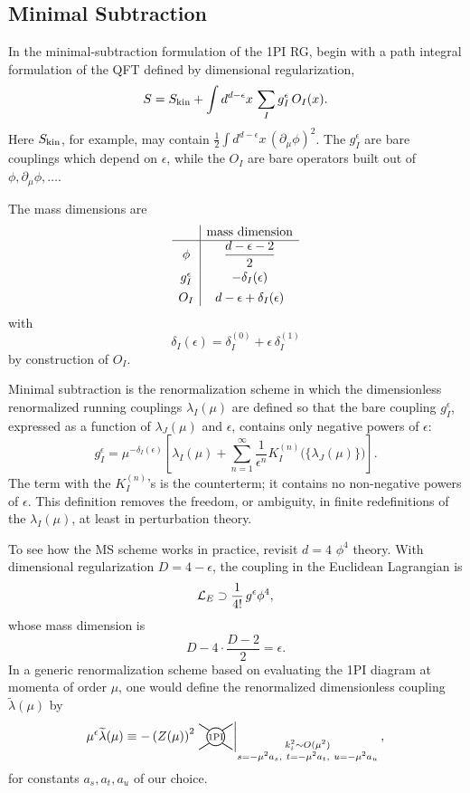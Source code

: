 \subsection{Minimal Subtraction}

In the minimal-subtraction formulation of the 1PI RG, begin with a path
integral formulation of the QFT defined by dimensional regularization,
\[
  S
  =
  S_{\rm kin}
  +
  \int d^{d-\epsilon}x\,
  \sum_I g_I^\epsilon\,O_I(x).
\]
Here \(S_{\rm kin}\), for example, may contain
\(\frac12\int d^{d-\epsilon}x\,(\partial_\mu\phi)^2\).  The \(g_I^\epsilon\)
are bare couplings which depend on \(\epsilon\), while the \(O_I\) are bare
operators built out of \(\phi,\partial_\mu\phi,\ldots\).

The mass dimensions are
\[
  \begin{array}{c|c}
    & \hbox{mass dimension}
    \\ \hline
    \phi & \dfrac{d-\epsilon-2}{2}
    \\[0.6em]
    g_I^\epsilon & -\delta_I(\epsilon)
    \\[0.4em]
    O_I & d-\epsilon+\delta_I(\epsilon)
  \end{array}
\]
with
\[
  \delta_I(\epsilon)=\delta_I^{(0)}+\epsilon\,\delta_I^{(1)}
\]
by construction of \(O_I\).

Minimal subtraction is the renormalization scheme in which the dimensionless
renormalized running couplings \(\lambda_I(\mu)\) are defined so that the bare
coupling \(g_I^\epsilon\), expressed as a function of \(\lambda_J(\mu)\) and
\(\epsilon\), contains only negative powers of \(\epsilon\):
\[
  g_I^\epsilon
  =
  \mu^{-\delta_I(\epsilon)}
  \left[
    \lambda_I(\mu)
    +
    \sum_{n=1}^\infty
    \frac{1}{\epsilon^n}
    K_I^{(n)}\bigl(\{\lambda_J(\mu)\}\bigr)
  \right].
\]
The term with the \(K_I^{(n)}\)'s is the counterterm; it contains no
non-negative powers of \(\epsilon\).  This definition removes the freedom, or
ambiguity, in finite redefinitions of the \(\lambda_I(\mu)\), at least in
perturbation theory.

To see how the MS scheme works in practice, revisit \(d=4\) \(\phi^4\)
theory.  With dimensional regularization \(D=4-\epsilon\), the coupling in
the Euclidean Lagrangian is
\[
  {\cal L}_E\supset \frac{1}{4!}\,g^\epsilon\phi^4,
\]
whose mass dimension is
\[
  D-4\cdot\frac{D-2}{2}=\epsilon.
\]
In a generic renormalization scheme based on evaluating the 1PI diagram at
momenta of order \(\mu\), one would define the renormalized dimensionless
coupling \(\widetilde\lambda(\mu)\) by
\[
  \mu^\epsilon\widetilde\lambda(\mu)
  \equiv
  -\left(Z(\mu)\right)^2
  \left.
  \begin{tikzpicture}[baseline=-0.6ex,scale=0.55]
    \draw[line width=0.7pt] (0,0) circle (0.45);
    \node at (0,0) {\scriptsize 1PI};
    \draw[line width=0.7pt] (-0.85,0.65) -- (-0.32,0.32);
    \draw[line width=0.7pt] (-0.85,-0.65) -- (-0.32,-0.32);
    \draw[line width=0.7pt] (0.85,0.65) -- (0.32,0.32);
    \draw[line width=0.7pt] (0.85,-0.65) -- (0.32,-0.32);
  \end{tikzpicture}
  \right|_{\substack{k_i^2\sim O(\mu^2)\\
  s=-\mu^2 a_s,\ t=-\mu^2 a_t,\ u=-\mu^2 a_u}},
\]
for constants \(a_s,a_t,a_u\) of our choice.

